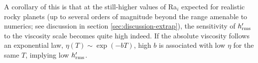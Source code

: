 A corollary of this is that at the still-higher values of Ra$_i$ expected for realistic rocky planets (up to several orders of magnitude beyond the range amenable to numerics; see discussion in section \ref{sec:discussion-extrap}), the sensitivity of $h_{\rm rms}^\prime$ to the viscosity scale becomes quite high indeed. If the absolute viscosity follows an exponential law, $\eta(T) \sim \exp(-b T)$, high $b$ is associated with low $\eta$ for the same $T$, implying low $h_{\rm rms}^\prime$. 








